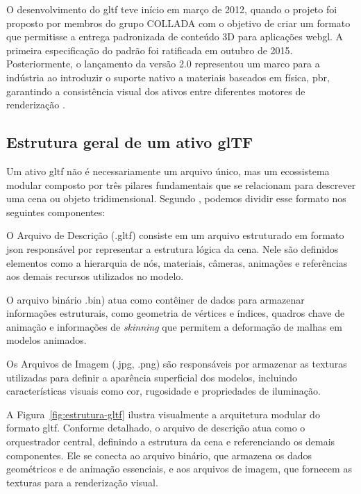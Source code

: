 O desenvolvimento do \gls{gltf} teve início em março de 2012, quando o projeto foi
proposto por membros do grupo COLLADA com o objetivo de criar um formato que
permitisse a entrega padronizada de conteúdo 3D para aplicações \gls{webgl}. A
primeira especificação do padrão foi ratificada em outubro de 2015. Posteriormente,
o lançamento da versão 2.0 representou um marco para a indústria ao introduzir o
suporte nativo a materiais baseados em física, \gls{pbr}, garantindo a consistência
visual dos ativos entre diferentes motores de renderização
\cite{Houston2019,Khronos2022}.

\subsection{Estrutura geral de um ativo glTF}

Um ativo \gls{gltf} não é necessariamente um arquivo único, mas um ecossistema
modular composto por três pilares fundamentais que se relacionam para descrever uma
cena ou objeto tridimensional. Segundo , podemos dividir
esse formato nos seguintes componentes:

\begin{alineas}
  \item O Arquivo de Descrição (.gltf) consiste em um arquivo estruturado
  em formato \gls{json} responsável por representar a estrutura lógica da cena.
  Nele são definidos elementos como a hierarquia de nós, materiais, câmeras,
  animações e referências aos demais recursos utilizados no modelo.

  \item O arquivo binário .bin) atua como contêiner de dados para
  armazenar informações estruturais, como geometria de vértices e índices, quadros
  chave de animação e informações de \textit{skinning} que permitem a deformação de
  malhas em modelos animados.

  \item Os Arquivos de Imagem (.jpg, .png) são responsáveis por
  armazenar as texturas utilizadas para definir a aparência superficial dos
  modelos, incluindo características visuais como cor, rugosidade e propriedades de
  iluminação.
\end{alineas}

A Figura~\ref{fig:estrutura-gltf} ilustra visualmente a arquitetura modular do
formato \gls{gltf}. Conforme detalhado, o arquivo de descrição atua como o
orquestrador central, definindo a estrutura da cena e referenciando os demais
componentes. Ele se conecta ao arquivo binário, que armazena os dados geométricos e
de animação essenciais, e aos arquivos de imagem, que fornecem as texturas para a
renderização visual.

